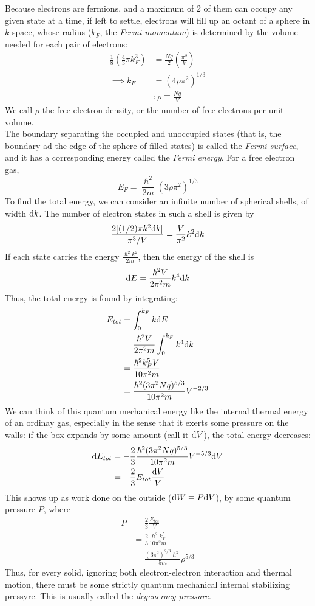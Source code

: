 \documentclass[a4paper]{article}
\begin{document}
Because electrons are fermions, and a maximum of 2 of them can occupy any
given state at a time, if left to settle, electrons will fill up an octant
of a sphere in $k$ space, whose radius ($k_F$, the \emph{Fermi momentum}) is
determined by the volume needed for each pair of electrons:
\begin{align*}
	\frac{1}{8} \left( \frac{4}{3} \pi k_F^3 \right)
	&= \frac{Nq}{2} \left( \frac{\pi^3}{V} \right)\\
	\implies k_F &= (4\rho\pi^2)^{1/3}\\
		     &: \rho \equiv \frac{Nq}{V}
\end{align*}
We call $\rho$ the free electron density, or the number of free electrons per
unit volume.\\
The boundary separating the occupied and unoccupied states (that is, the
boundary ad the edge of the sphere of filled states) is called the
\emph{Fermi surface}, and it has a corresponding energy called the
\emph{Fermi energy}. For a free electron gas,
\[ E_F = \frac{\hslash^2}{2m}(3\rho\pi^2)^{1/3} \]
To find the total energy, we can consider an infinite number of spherical
shells, of width $\mathrm{d} k$. The number of electron states in such a shell is
given by
\[ \frac{2[(1/2)\pi k^2\mathrm{d} k]}{\pi^3/V} = \frac{V}{\pi^2}k^2\mathrm{d} k \]
If each state carries the energy $\frac{\hslash^2 k^2}{2m}$, then the energy
of the shell is
\[ \mathrm{d} E = \frac{\hslash^2 V}{2\pi^2 m}k^4\mathrm{d} k \]
Thus, the total energy is found by integrating:
\begin{align*}
	E_{tot} &= \int_0^{k_F} k\mathrm{d} E\\
		&= \frac{\hslash^2 V}{2\pi^2 m} \int_0^{k_F} k^4 \mathrm{d} k\\
		&= \frac{\hslash^2 k_F^5 V}{10\pi^2 m}\\
		&= \frac{h^2(3\pi^2Nq)^{5/3}}{10\pi^2m}V^{-2/3}
\end{align*}
We can think of this quantum mechanical energy like the internal thermal energy
of an ordinay gas, especially in the sense that it exerts some pressure on the
walls: if the box expands by some amount (call it $\mathrm{d} V$), the total energy
decreases:
\begin{align*}
	\mathrm{d} E_{tot} &= -\frac{2}{3} \frac{\hslash^2(3\pi^2Nq)^{5/3}}{10\pi^2m}
			V^{-5/3}\mathrm{d} V\\
			&=  -\frac{2}{3} E_{tot}\frac{\mathrm{d} V}{V}
\end{align*}
This shows up as work done on the outside ($\mathrm{d} W = P \mathrm{d} V$), by some quantum
pressure $P$, where
\begin{align*}
	P &= \frac{2}{3} \frac{E_{tot}}{V}\\
	  &= \frac{2}{3} \frac{\hslash^2 k_F^5}{10\pi^2 m}\\
	  &= \frac{(3\pi^2)^{2/3}\hslash^2}{5m}\rho^{5/3}
\end{align*}
Thus, for every solid, ignoring both electron-electron interaction and
thermal motion, there must be some strictly quantum mechanical internal
stabilizing pressyre. This is usually called the \emph{degeneracy pressure}.
\end{document}
